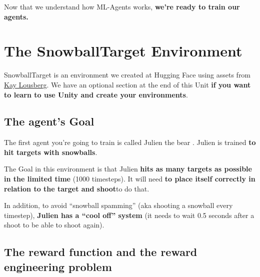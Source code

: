 \documentclass[11pt,a4paper]{article}
\begin{document}

Now that we understand how ML-Agents works, \textbf{we're ready to train our agents.}

\section{The SnowballTarget Environment}\label{the-snowballtarget-environment}


SnowballTarget is an environment we created at Hugging Face using assets from \href{https://kaylousberg.com/}{Kay Lousberg}. We have an optional section at the end of this Unit \textbf{if you want to learn to use Unity and create your environments}.

\subsection{The agent's Goal}\label{the-agents-goal}

The first agent you're going to train is called Julien the bear . Julien is trained \textbf{to hit targets with snowballs}.

The Goal in this environment is that Julien \textbf{hits as many targets as possible in the limited time} (1000 timesteps). It will need \textbf{to place itself correctly in relation to the target and shoot}to do that.

In addition, to avoid ``snowball spamming'' (aka shooting a snowball every timestep), \textbf{Julien has a ``cool off'' system} (it needs to wait 0.5 seconds after a shoot to be able to shoot again).


\subsection{The reward function and the reward engineering problem}\label{the-reward-function-and-the-reward-engineering-problem}
\end{document}

